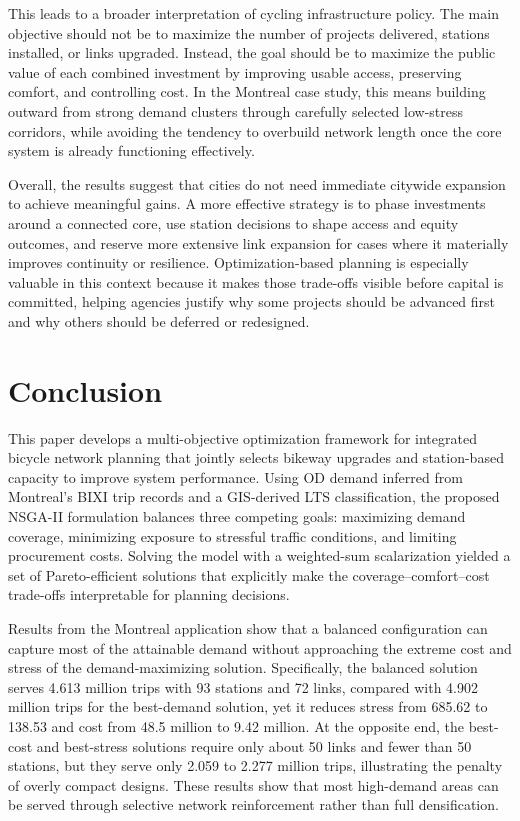 \documentclass[preprint,authoryear,10pt]{elsarticle}
\begin{document}
This leads to a broader interpretation of cycling infrastructure policy. The main objective should not be to maximize the number of projects delivered, stations installed, or links upgraded. Instead, the goal should be to maximize the public value of each combined investment by improving usable access, preserving comfort, and controlling cost. In the Montreal case study, this means building outward from strong demand clusters through carefully selected low-stress corridors, while avoiding the tendency to overbuild network length once the core system is already functioning effectively.

Overall, the results suggest that cities do not need immediate citywide expansion to achieve meaningful gains. A more effective strategy is to phase investments around a connected core, use station decisions to shape access and equity outcomes, and reserve more extensive link expansion for cases where it materially improves continuity or resilience. Optimization-based planning is especially valuable in this context because it makes those trade-offs visible before capital is committed, helping agencies justify why some projects should be advanced first and why others should be deferred or redesigned.


\section{Conclusion}\label{conclusion}

This paper develops a multi-objective optimization framework for integrated bicycle network planning that jointly selects bikeway upgrades and station-based capacity to improve system performance. Using OD demand inferred from Montreal’s BIXI trip records and a GIS-derived LTS classification, the proposed NSGA-II formulation balances three competing goals: maximizing demand coverage, minimizing exposure to stressful traffic conditions, and limiting procurement costs. Solving the model with a weighted-sum scalarization yielded a set of Pareto-efficient solutions that explicitly make the coverage--comfort--cost trade-offs interpretable for planning decisions.

Results from the Montreal application show that a balanced configuration can capture most of the attainable demand without approaching the extreme cost and stress of the demand-maximizing solution. Specifically, the balanced solution serves 4.613 million trips with 93 stations and 72 links, compared with 4.902 million trips for the best-demand solution, yet it reduces stress from 685.62 to 138.53 and cost from 48.5 million to 9.42 million. At the opposite end, the best-cost and best-stress solutions require only about 50 links and fewer than 50 stations, but they serve only 2.059 to 2.277 million trips, illustrating the penalty of overly compact designs. These results show that most high-demand areas can be served through selective network reinforcement rather than full densification.
\end{document}

